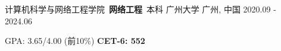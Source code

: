 

\begin{cventries}

  \cventry
    {计算机科学与网络工程学院\ \textbf{网络工程}\ 本科} %
    {广州大学} %
    {广州, 中国} %
    {2020.09 - 2024.06} %
    {
      \begin{cvitems} %
        \item {GPA: 3.65/4.00 (前10\%) \hspace{1mm} \textbf{CET-6: 552}}
      \end{cvitems}
    }

\end{cventries}
